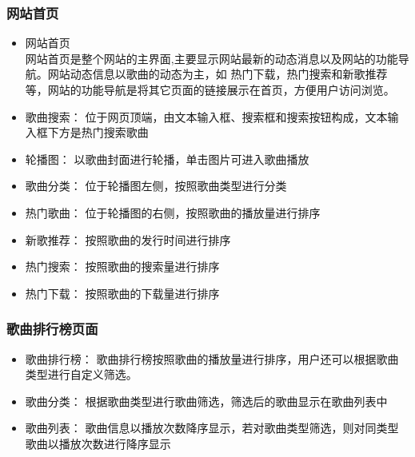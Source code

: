 \documentclass[UTF8,14pt]{article}
\numberwithin{figure}{subsubsection}
\numberwithin{table}{subsubsection}
\begin{document}
\subsubsection{网站首页}
\begin{itemize}
	\setlength{\itemsep}{0pt}
	      \setlength{\parsep}{0pt}
	      \setlength{\parskip}{0pt}
	\item 网站首页\\
	      网站首页是整个网站的主界面,主要显示网站最新的动态消息以及网站的功能导航。网站动态信息以歌曲的动态为主，如
	      热门下载，热门搜索和新歌推荐等，网站的功能导航是将其它页面的链接展示在首页，方便用户访问浏览。
	\item 歌曲搜索：
	      位于网页顶端，由文本输入框、搜索框和搜索按钮构成，文本输入框下方是热门搜索歌曲
	\item 轮播图：
	      以歌曲封面进行轮播，单击图片可进入歌曲播放
	\item 歌曲分类：
	      位于轮播图左侧，按照歌曲类型进行分类
	\item 热门歌曲：
	      位于轮播图的右侧，按照歌曲的播放量进行排序
	\item 新歌推荐：
	      按照歌曲的发行时间进行排序
	\item 热门搜索：
	      按照歌曲的搜索量进行排序
	\item 热门下载：
	      按照歌曲的下载量进行排序
\end{itemize}
\vspace*{-0.3cm}
\subsubsection{歌曲排行榜页面}
\begin{itemize}
	\setlength{\itemsep}{0pt}
	      \setlength{\parsep}{0pt}
	      \setlength{\parskip}{0pt}

	\item 歌曲排行榜：
	      歌曲排行榜按照歌曲的播放量进行排序，用户还可以根据歌曲类型进行自定义筛选。
	\item 歌曲分类：
	      根据歌曲类型进行歌曲筛选，筛选后的歌曲显示在歌曲列表中
	\item 歌曲列表：
	      歌曲信息以播放次数降序显示，若对歌曲类型筛选，则对同类型歌曲以播放次数进行降序显示
\end{itemize}
\vspace*{-0.3cm}
\end{document}

